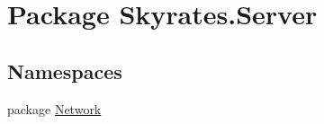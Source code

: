 \hypertarget{namespace_skyrates_1_1_server}{\section{Package Skyrates.\-Server}
\label{namespace_skyrates_1_1_server}
}
\subsection*{Namespaces}
\begin{DoxyCompactItemize}
\item 
package \hyperlink{namespace_skyrates_1_1_server_1_1_network}{Network}
\end{DoxyCompactItemize}

